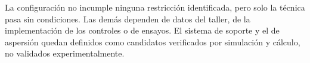 \endgroup

La configuración no incumple ninguna restricción identificada, pero solo la técnica pasa sin condiciones. Las demás dependen de datos del taller, de la implementación de los controles o de ensayos. El sistema de soporte y el de aspersión quedan definidos como candidatos verificados por simulación y cálculo, no validados experimentalmente.
